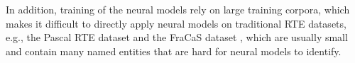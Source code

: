 In addition, training of the neural models rely on large training corpora,
which makes it difficult to directly apply neural models on
traditional RTE datasets, e.g., the Pascal RTE dataset \cite{dagan2006pascal} and the FraCaS dataset \cite{cooper1996using}, which are usually small
and contain many named entities that are hard for neural models to identify.